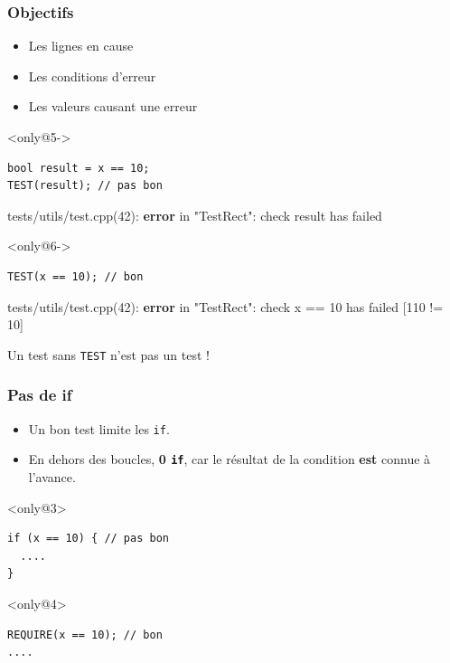 \documentclass{beamer}
\newcommand{\code}[1]{\texttt{#1}}
\begin{document}
\begin{frame}[fragile]
\frametitle{Objectifs}


\begin{itemize}
 \item<2-> Les lignes en cause
 \item<3-> Les conditions d'erreur
 \item<4-> Les valeurs causant une erreur
\end{itemize}

\begin{exampleblock}{}<only@5->
\begin{lstlisting}
bool result = x == 10;
TEST(result); // pas bon
\end{lstlisting}

{\color{f7}tests/utils/test.cpp(42)}: \textbf{\color{f1}error} in "{\color{f5}TestRect}":
 {\color{f4}check} {\color{f1}result} has failed
\end{exampleblock}

\begin{exampleblock}{}<only@6->
\begin{lstlisting}
TEST(x == 10); // bon
\end{lstlisting}

{\color{f7}tests/utils/test.cpp(42)}: \textbf{\color{f1}error} in "{\color{f5}TestRect}":
 {\color{f4}check} {\color{f1}x} {\color{f3}==} {\color{f1}10 has} failed [{\color{f6}110} {\color{f3}!=} {\color{f6}10}]
\end{exampleblock}
\end{frame}


\begin{frame}[fragile]
Un test sans \code{TEST} n'est pas un test !
\end{frame}


\begin{frame}[fragile]
\frametitle{Pas de if}

\begin{itemize}[<+->]
  \item Un bon test limite les \code{if}.
  \item En dehors des boucles, \textbf{0 \code{if}}, car le résultat de la condition \textbf{est} connue à l'avance.
\end{itemize}

\begin{exampleblock}{}<only@3>
\begin{lstlisting}
if (x == 10) { // pas bon
  ....
}
\end{lstlisting}
\end{exampleblock}

\begin{exampleblock}{}<only@4>
\begin{lstlisting}
REQUIRE(x == 10); // bon
....
\end{lstlisting}
\end{exampleblock}
\end{frame}
\end{document}
